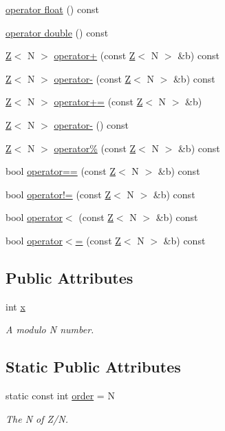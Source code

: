 \begin{DoxyCompactItemize}
\item 
\hyperlink{classZ_a9bb3636d1ffd75dc1a221251f71d4781}{operator float} () const
\item 
\hyperlink{classZ_a819290a913ce32272c6cdb7407846057}{operator double} () const
\item 
\hyperlink{classZ}{Z}$<$ N $>$ \hyperlink{classZ_a1a01f7aaa064fe201c2e0cc72da02960}{operator+} (const \hyperlink{classZ}{Z}$<$ N $>$ \&b) const
\item 
\hyperlink{classZ}{Z}$<$ N $>$ \hyperlink{classZ_ac4751d1ef56abaee7ed90f29939324f2}{operator-\/} (const \hyperlink{classZ}{Z}$<$ N $>$ \&b) const
\item 
\hyperlink{classZ}{Z}$<$ N $>$ \hyperlink{classZ_a3b61b86ccc14f54010c58e8ff2745d91}{operator+=} (const \hyperlink{classZ}{Z}$<$ N $>$ \&b)
\item 
\hyperlink{classZ}{Z}$<$ N $>$ \hyperlink{classZ_a298e4392b981d2ce937823bb26cb7421}{operator-\/} () const
\item 
\hyperlink{classZ}{Z}$<$ N $>$ \hyperlink{classZ_a4715a86eb00c00fce2be3d1c1bf24440}{operator\%} (const \hyperlink{classZ}{Z}$<$ N $>$ \&b) const
\item 
bool \hyperlink{classZ_aee67aee77949c30eb8a0645d7248044c}{operator==} (const \hyperlink{classZ}{Z}$<$ N $>$ \&b) const
\item 
bool \hyperlink{classZ_a91a2c48fff9d0b4b11e3e7da09c68b7b}{operator!=} (const \hyperlink{classZ}{Z}$<$ N $>$ \&b) const
\item 
bool \hyperlink{classZ_ac9464cf14368b566bd4897b7a83d0861}{operator$<$} (const \hyperlink{classZ}{Z}$<$ N $>$ \&b) const
\item 
bool \hyperlink{classZ_a52b5a9afa8054c108b4967dfe2930642}{operator$<$=} (const \hyperlink{classZ}{Z}$<$ N $>$ \&b) const
\end{DoxyCompactItemize}
\subsection*{Public Attributes}
\begin{DoxyCompactItemize}
\item 
int \hyperlink{classZ_a81f004f23dff9772403dd7a4452ad3c6}{x}
\begin{DoxyCompactList}\small\item\em A modulo N number. \end{DoxyCompactList}\end{DoxyCompactItemize}
\subsection*{Static Public Attributes}
\begin{DoxyCompactItemize}
\item 
static const int \hyperlink{classZ_a8da63061091de9ee7a146a856f70c4b8}{order} = N
\begin{DoxyCompactList}\small\item\em The N of Z/N. \end{DoxyCompactList}\end{DoxyCompactItemize}


